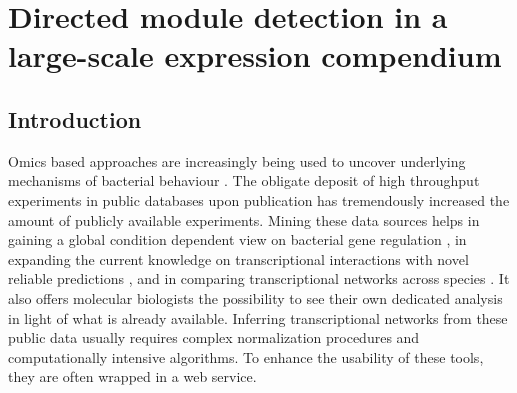 \chapter{Directed module detection in a large-scale expression compendium}\label{ch:distiller}


\instructionsintroduction

\newcommand{\distsubparagraph}[1]{\hspace{-2mm}\textsf{\textbf{#1}}}



\section{Introduction}

Omics based approaches are increasingly being used to uncover underlying 
mechanisms of bacterial behaviour \cite{Fierro2008}. The obligate deposit of 
high throughput experiments in public databases upon publication has 
tremendously increased the amount of publicly available experiments. Mining 
these data sources helps in gaining a global condition dependent view on 
bacterial gene regulation \cite{Lemmens2009, Fadda2009}, in expanding the 
current knowledge on transcriptional interactions with novel reliable 
predictions \cite{Faith2007, Ernst2008}, and in comparing transcriptional 
networks across species \cite{Fierro2008, Babu2009}. It also offers molecular 
biologists the possibility to see their own dedicated analysis in light of what 
is already available. Inferring transcriptional networks from these public data 
usually requires complex normalization procedures \cite{Faith2008} and 
computationally intensive algorithms. To enhance the usability of these tools, 
they are often wrapped in a web service.


